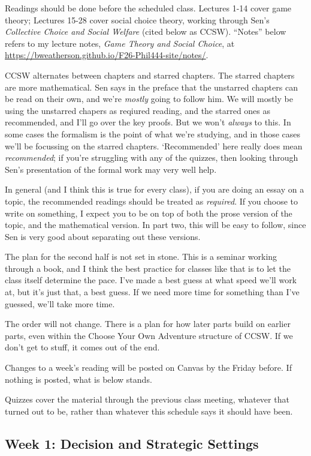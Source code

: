 \documentclass[
  letterpaper,
  DIV=11,
  numbers=noendperiod]{scrartcl}
\begin{document}
Readings should be done before the scheduled class. Lectures 1-14 cover
game theory; Lectures 15-28 cover social choice theory, working through
Sen's \emph{Collective Choice and Social Welfare} (cited below as CCSW).
``Notes'' below refers to my lecture notes, \emph{Game Theory and Social
Choice}, at \url{https://bweatherson.github.io/F26-Phil444-site/notes/}.

CCSW alternates between chapters and starred chapters. The starred
chapters are more mathematical. Sen says in the preface that the
unstarred chapters can be read on their own, and we're \emph{mostly}
going to follow him. We will mostly be using the unstarred chapers as
reqiured reading, and the starred ones as recommended, and I'll go over
the key proofs. But we won't \emph{always} to this. In some cases the
formalism is the point of what we're studying, and in those cases we'll
be focussing on the starred chapters. `Recommended' here really does
mean \emph{recommended}; if you're struggling with any of the quizzes,
then looking through Sen's presentation of the formal work may very well
help.

In general (and I think this is true for every class), if you are doing
an essay on a topic, the recommended readings should be treated as
\emph{required}. If you choose to write on something, I expect you to be
on top of both the prose version of the topic, and the mathematical
version. In part two, this will be easy to follow, since Sen is very
good about separating out these versions.

The plan for the second half is not set in stone. This is a seminar
working through a book, and I think the best practice for classes like
that is to let the class itself determine the pace. I've made a best
guess at what speed we'll work at, but it's just that, a best guess. If
we need more time for something than I've guessed, we'll take more time.

The order will not change. There is a plan for how later parts build on
earlier parts, even within the Choose Your Own Adventure structure of
CCSW. If we don't get to stuff, it comes out of the end.

Changes to a week's reading will be posted on Canvas by the Friday
before. If nothing is posted, what is below stands.

Quizzes cover the material through the previous class meeting, whatever
that turned out to be, rather than whatever this schedule says it should
have been.

\subsection{Week 1: Decision and Strategic
Settings}\label{week-1-decision-and-strategic-settings}
\end{document}
